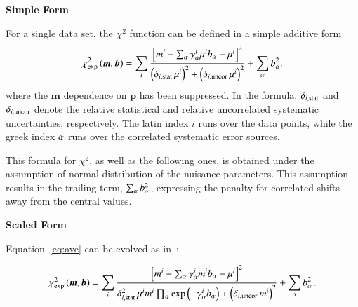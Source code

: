 \begin{description}
\item \bf{Simple Form} \rm

For a single data set, the $\chi^2$ function can be defined in a simple additive form 
\begin{equation}
 \chi^2_{\rm exp}\left(\boldsymbol{m},\boldsymbol{b}\right) = %
 \sum_i
 \frac{\left[m^i
- \sum_\ci \gamma^i_\ci \mu^i b_\ci  - {\mu^i} \right]^2}
{ \textstyle \left(\delta_{i,{\rm stat}}\, \mu^i\right)^2 +
\left(\delta_{i,{\rm uncor}}\,  \mu^i\right)^2}
 + \sum_\ci b^2_\ci.
\label{eq:ave}
\end{equation}
%
where the $\boldsymbol{m}$ dependence on $\boldsymbol{p}$ has been suppressed. In the formula,
$\delta_{i,{\rm stat}}$ and $\delta_{i,{\rm uncor}}$
denote the relative statistical  
and relative uncorrelated systematic uncertainties, respectively.
The latin index $i$ runs over the data points, while the greek index $\alpha$ runs over the correlated systematic error sources.


This formula for $\chi^2$, as well as the following ones, is obtained under the assumption of normal distribution of the nuisance parameters. This assumption results in the trailing term,
$\sum_\alpha b^2_\alpha$,
expressing the penalty for correlated shifts away from the central values.


\item \bf{Scaled Form} \rm

Equation~\ref{eq:ave} can be evolved as in~\cite{Aaron:2009bp}:

%
\begin{equation}
 \chi^2_{\rm exp}\left(\boldsymbol{m},\boldsymbol{b}\right) = %
 \sum_i
 \frac{\left[m^i
- \sum_\ci \gamma^i_\ci m^i b_\ci  - {\mu^i} \right]^2}
{ \textstyle \delta^2_{i,{\rm stat}}\,\mu^i 
m^i   \prod_\ci \exp \left( -\gamma^i_\ci  b_\ci \right)+
\left(\delta_{i,{\rm uncor}}\,  m^i\right)^2}
 + \sum_\ci b^2_\ci
 \,.
\label{eq:aven}
\end{equation}
%


\end{description}
